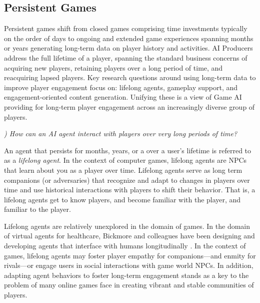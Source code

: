 \documentclass[conference]{IEEEtran}
\newcounter{questionno}
\newcommand{\subsubsectionx}[1]{{\em {\arabic{questionno}) #1}}
	\addtocounter{questionno}{1}
	}
\begin{document}
\subsection{Persistent Games}

Persistent games shift from closed games comprising time investments typically on the order of days to ongoing and extended game experiences spanning months or years generating long-term data on player history and activities. 
AI Producers address the full lifetime of a player, spanning the standard business concerns of acquiring new players, retaining players over a long period of time, and reacquiring lapsed players. 
Key research questions around using long-term data to improve player engagement focus on: lifelong agents, gameplay support, and engagement-oriented content generation. 
Unifying these is a view of Game AI providing for long-term player engagement across an increasingly diverse group of players.

\subsubsectionx{How can an AI agent interact with players over very long periods of time?}
%
An agent that persists for months, years, or a over a user's lifetime is referred to as a {\em lifelong agent}. 
In the context of computer games, lifelong agents are NPCs that learn about you as a player over time. 
Lifelong agents serve as long term companions (or adversaries) that 
recognize and adapt to  
changes in players over time and use historical interactions with players to shift their behavior.
That is, a lifelong agents get to know players, and become familiar with the player, and familiar to the player.
%

Lifelong agents are relatively unexplored in the domain of games.
In the domain of virtual agents for healthcare, Bickmore and colleagues have been designing and developing agents that interface with humans longitudinally \cite{bickmore2009:lifelong-agents}. 
In the context of games, lifelong agents may foster player empathy for companions---and enmity for rivals---or engage users in social interactions with game world NPCs. 
In addition, adapting agent behaviors to foster long-term engagement stands as a key to the problem of many online games face in creating vibrant and stable communities of players.

\end{document}
